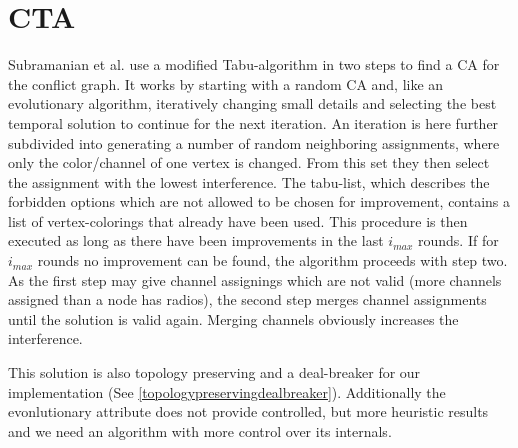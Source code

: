   \section{\ac{CTA}}
    Subramanian et al. \cite{CTA} use a modified Tabu-algorithm \cite{tabu} in two steps to find a \ac{CA} for the conflict graph.
    It works by starting with a random \ac{CA} and, like an evolutionary algorithm, 
    iteratively changing small details and selecting the best temporal solution to continue for the next iteration.
    An iteration is here further subdivided into generating a number of random neighboring assignments, where only the color/channel of one vertex is changed.
    From this set they then select the assignment with the lowest interference.
    The tabu-list, which describes the forbidden options which are not allowed to be chosen for improvement, contains a list of vertex-colorings that already have been used.
    This procedure is then executed as long as there have been improvements in the last \textit{$i_{max}$} rounds.
    If for \textit{$i_{max}$} rounds no improvement can be found, the algorithm proceeds with step two.
    As the first step may give channel assignings which are not valid (more channels assigned than a node has radios), the second step merges channel assignments 
    until the solution is valid again. Merging channels obviously increases the interference.
    
    This solution is also topology preserving and a deal-breaker for our implementation (See \ref{topologypreservingdealbreaker}).
    Additionally the evonlutionary attribute does not provide controlled, but more heuristic results and we need an algorithm with more control over its internals.
